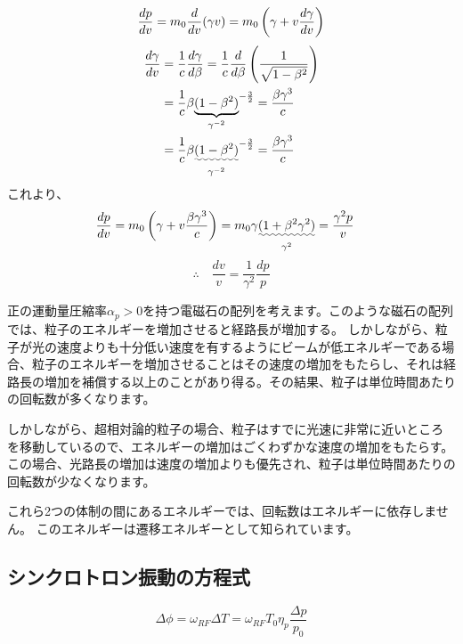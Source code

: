 \documentclass[10pt,a4paper]{ltjsarticle}
\begin{document}
\begin{tcolorbox}[title=式 (\ref{delta_v}) の導出]
    \begin{equation}
        \frac{dp}{dv} = m_0\frac{d}{dv}(\gamma v)
        = m_0 \left(\gamma + v \frac{d\gamma}{dv}\right) \notag
    \end{equation}
    \begin{align}
        \frac{d\gamma}{dv} & = \frac{1}{c}\frac{d\gamma}{d\beta}= \frac{1}{c}\frac{d}{d\beta}\left(\frac{1}{\sqrt{1-\beta^2}}\right) \notag \\
        & = \frac{1}{c} \beta \underset{\gamma^{-2}}{\underbrace{(1-\beta^2)}}^{-\frac{3}{2}} = \frac{\beta \gamma^3}{c} \notag \\
        & = \frac{1}{c} \beta \underset{\gamma^{-2}}{\uwave{(1-\beta^2)}}^{-\frac{3}{2}} = \frac{\beta \gamma^3}{c} \notag
    \end{align}
    これより、
    \begin{align}
        \frac{dp}{dv} & = m_0 \left(\gamma + v \frac{\beta \gamma^3}{c}\right)
        = m_0 \gamma \underset{\gamma^2}{\uwave{(1 + \beta^2 \gamma^2)}}
        = \frac{\gamma^2 p}{v} \notag
    \end{align}
    \begin{equation}
        \therefore \quad \frac{dv}{v} = \frac{1}{\gamma^2}\frac{dp}{p} \tag{B.1}
    \end{equation}
\end{tcolorbox}
%
正の運動量圧縮率$\alpha_p>0$を持つ電磁石の配列を考えます。このような磁石の配列では、粒子のエネルギーを増加させると経路長が増加する。 しかしながら、粒子が光の速度よりも十分低い速度を有するようにビームが低エネルギーである場合、粒子のエネルギーを増加させることはその速度の増加をもたらし、それは経路長の増加を補償する以上のことがあり得る。その結果、粒子は単位時間あたりの回転数が多くなります。

しかしながら、超相対論的粒子の場合、粒子はすでに光速に非常に近いところを移動しているので、エネルギーの増加はごくわずかな速度の増加をもたらす。 この場合、光路長の増加は速度の増加よりも優先され、粒子は単位時間あたりの回転数が少なくなります。

これら2つの体制の間にあるエネルギーでは、回転数はエネルギーに依存しません。 このエネルギーは遷移エネルギーとして知られています。

\subsection{シンクロトロン振動の方程式}
%
\begin{equation}
    \Delta \phi = \omega_{RF} \Delta T = \omega_{RF} T_0 \eta_p\frac{\Delta p}{p_0}
\end{equation}
\end{document}
